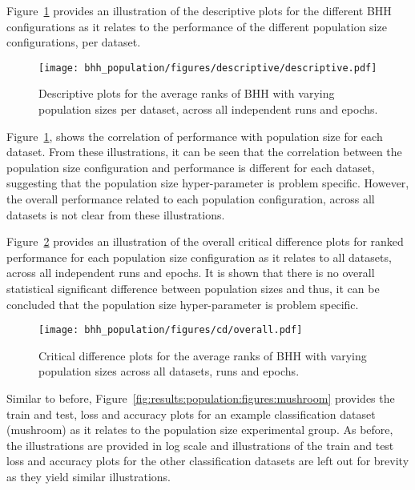 Figure~\ref{fig:results:population:descriptive:descriptive} provides an illustration of the descriptive plots for the different \acs{BHH} configurations as it relates to the performance of the different population size configurations, per dataset.

\begin{figure}[htb]
      \centering
      \texttt{[image: bhh\_population/figures/descriptive/descriptive.pdf]}
      \caption{Descriptive plots for the average ranks of \acs{BHH} with varying population sizes per dataset, across all independent runs and epochs.}
      \label{fig:results:population:descriptive:descriptive}
\end{figure}

Figure~\ref{fig:results:population:descriptive:descriptive}, shows the correlation of performance with population size for each dataset. From these illustrations, it can be seen that the correlation between the population size configuration and performance is different for each dataset, suggesting that the population size hyper-parameter is problem specific. However, the overall performance related to each population configuration, across all datasets is not clear from these illustrations.

Figure~\ref{fig:results:population:descriptive:cd} provides an illustration of the overall critical difference plots for ranked performance for each population size configuration as it relates to all datasets, across all independent runs and epochs. It is shown that there is no overall statistical significant difference between population sizes and thus, it can be concluded that the population size hyper-parameter is problem specific.

\begin{figure}[htb]
      \centering
      \texttt{[image: bhh\_population/figures/cd/overall.pdf]}
      \caption{Critical difference plots for the average ranks of \acs{BHH} with varying population sizes across all datasets, runs and epochs.}
      \label{fig:results:population:descriptive:cd}
\end{figure}

Similar to before, Figure~\ref{fig:results:population:figures:mushroom} provides the train and test, loss and accuracy plots for an example classification dataset (mushroom) as it relates to the population size experimental group. As before, the illustrations are provided in log scale and illustrations of the train and test loss and accuracy plots for the other classification datasets are left out for brevity as they yield similar illustrations.

